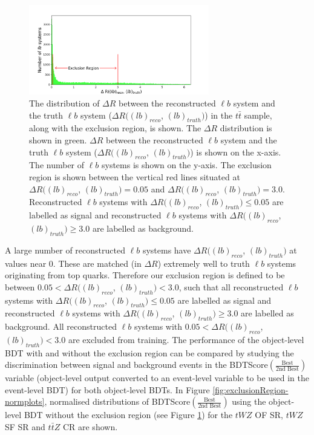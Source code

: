 \begin{figure}[h!]
    \centering
    \includegraphics[width=0.7\textwidth]{figures/DeltaR_lb_bdt.png}
    \caption{The distribution of $\Delta R$ between the reconstructed $\ell b$ system and the truth $\ell b$ system ($\Delta R((lb)_{reco}$, $(lb)_{truth})$) in the $t\bar{t}$ sample, along with the exclusion region, is shown. The $\Delta R$ distribution is shown in green. $\Delta R$ between the reconstructed $\ell b$ system and the truth $\ell b$ system ($\Delta R((lb)_{reco}$, $(lb)_{truth})$) is shown on the x-axis. The number of $\ell b$ systems is shown on the y-axis. The exclusion region is shown between the vertical red lines situated at $\Delta R((lb)_{reco}$, $(lb)_{truth}) = 0.05$ and $\Delta R((lb)_{reco}$, $(lb)_{truth})=3.0$. Reconstructed $\ell b$ systems with $\Delta R((lb)_{reco}$, $(lb)_{truth}) \leq 0.05$ are labelled as signal and reconstructed $\ell b$ systems with $\Delta R((lb)_{reco}$, $(lb)_{truth}) \geq 3.0$ are labelled as background. }
    \label{fig:exclusionRegion}
\end{figure}

A large number of reconstructed $\ell b$ systems have $\Delta R((lb)_{reco}$, $(lb)_{truth})$ at values near $0$. These are matched (in $\Delta R$) extremely well to truth $\ell b$ systems originating from top quarks. Therefore our exclusion region is defined to be between $0.05 < \Delta R((lb)_{reco}$, $(lb)_{truth}) < 3.0$, such that all reconstructed $\ell b$ systems with $\Delta R((lb)_{reco}$, $(lb)_{truth}) \leq 0.05$ are labelled as signal and reconstructed $\ell b$ systems with $\Delta R((lb)_{reco}$, $(lb)_{truth}) \geq 3.0$ are labelled as background. All reconstructed $\ell b$ systems with $0.05 < \Delta R((lb)_{reco}$, $(lb)_{truth}) < 3.0$ are excluded from training. The performance of the object-level BDT with and without the exclusion region can be compared by studying the discrimination between signal and background events in the BDTScore$(\frac{\text{Best}}{\text{2nd Best}})$ variable (object-level output converted to an event-level variable to be used in the event-level BDT) for both object-level BDTs. In Figure \ref{fig:exclusionRegion-normplots}, normalised distributions of BDTScore$(\frac{\text{Best}}{\text{2nd Best}})$ using the object-level BDT without the exclusion region (see Figure \ref{fig:exclusionRegion}) for the $tWZ$ OF SR, $tWZ$ SF SR and $t\bar{t}Z$ CR are shown.



